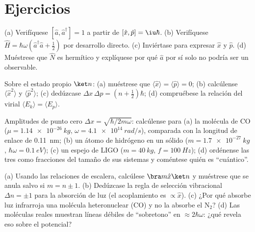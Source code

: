 \section{Ejercicios}

\begin{exercise}[$\star$]\label{exo:b3:harmonic-oscillator:1}
(a) Verifíquese $[\hat a, \hat a^\dagger] = 1$ a partir de $[\hat x, \hat p] =
\iu\hbar$. (b) Verifíquese $\hat H = \hbar\omega(\hat a^\dagger\hat a +
\tfrac12)$ por desarrollo directo. (c) Inviértase para expresar $\hat x$ y
$\hat p$. (d) Muéstrese que $\hat N$ es hermítico y explíquese por qué
$\hat a$ por sí solo no podría ser un observable.
\end{exercise}

\begin{exercise}[$\star$]\label{exo:b3:harmonic-oscillator:2}
Sobre el estado propio $\ket n$: (a) muéstrese que $\langle\hat x\rangle =
\langle\hat p\rangle = 0$; (b) calcúlense $\langle\hat x^2\rangle$ y
$\langle\hat p^2\rangle$; (c) dedúzcase $\Delta x\,\Delta p = (n +
\tfrac12)\hbar$; (d) compruébese la relación del virial $\langle E_k\rangle =
\langle E_p\rangle$.
\end{exercise}

\begin{exercise}[$\star$]\label{exo:b3:harmonic-oscillator:3}
Amplitudes de punto cero $\Delta x = \sqrt{\hbar/2m\omega}$: calcúlense
para (a) la molécula de CO ($\mu = \qty{1.14e-26}{kg}$, $\omega =
\qty{4.1e14}{rad/s}$), comparada con la longitud de enlace de
\qty{0.11}{nm}; (b) un átomo de hidrógeno en un sólido ($m =
\qty{1.7e-27}{kg}$, $\hbar\omega = \qty{0.1}{eV}$); (c) un espejo de LIGO
($m = \qty{40}{kg}$, $f = \qty{100}{Hz}$); (d) ordénense las tres como
fracciones del tamaño de sus sistemas y coméntese quién es ``cuántico''.
\end{exercise}

\begin{exercise}[$\star$]\label{exo:b3:harmonic-oscillator:4}
(a) Usando las relaciones de escalera, calcúlese $\bra m\hat x\ket n$ y
muéstrese que se anula salvo si $m = n \pm 1$. (b) Dedúzcase la regla de
selección vibracional $\Delta n = \pm1$ para la absorción de luz (el
acoplamiento es $\propto\hat x$). (c) ¿Por qué absorbe luz infrarroja una
molécula heteronuclear (CO) y no la absorbe el N$_2$? (d) Las moléculas
reales muestran líneas débiles de ``sobretono'' en $\approx 2\hbar\omega$:
¿qué revela eso sobre el potencial?
\end{exercise}

